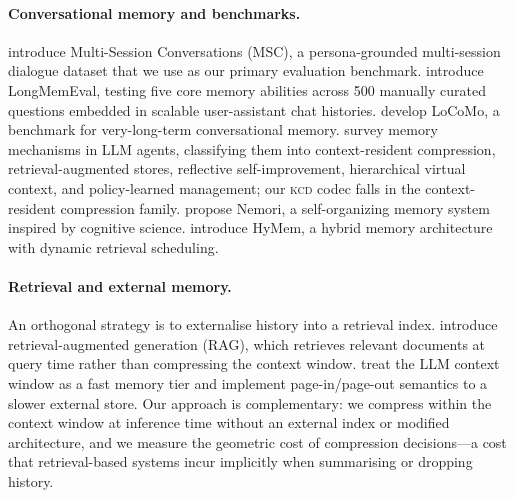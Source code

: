 \documentclass[11pt]{article}
\newcommand{\kcd}{\textsc{kcd}}
\begin{document}
\paragraph{Conversational memory and benchmarks.}
\citet{xu-etal-2022-beyond} introduce Multi-Session Conversations (MSC),
a persona-grounded multi-session dialogue dataset that we use as
our primary evaluation benchmark.
\citet{wu-etal-2025-longmemeval} introduce LongMemEval,
testing five core memory abilities across 500 manually curated questions
embedded in scalable user-assistant chat histories.
\citet{maharana-etal-2024-evaluating} develop LoCoMo,
a benchmark for very-long-term conversational memory.
\citet{luo-etal-2026-from} survey memory mechanisms in LLM agents,
classifying them into context-resident compression, retrieval-augmented stores,
reflective self-improvement, hierarchical virtual context, and policy-learned management;
our \kcd{} codec falls in the context-resident compression family.
\citet{nan-etal-2025-nemori} propose Nemori, a self-organizing memory system
inspired by cognitive science.
\citet{wang-etal-2025-hymem} introduce HyMem, a hybrid memory architecture
with dynamic retrieval scheduling.

\paragraph{Retrieval and external memory.}
An orthogonal strategy is to externalise history into a retrieval index.
\citet{lewis-etal-2020-retrieval} introduce retrieval-augmented generation (RAG),
which retrieves relevant documents at query time rather than compressing
the context window.
\citet{packer-etal-2023-memgpt} treat the LLM context window as a fast memory
tier and implement page-in/page-out semantics to a slower external store.
Our approach is complementary: we compress within the context window at
inference time without an external index or modified architecture,
and we measure the geometric cost of compression decisions---a cost that
retrieval-based systems incur implicitly when summarising or dropping history.
\end{document}
